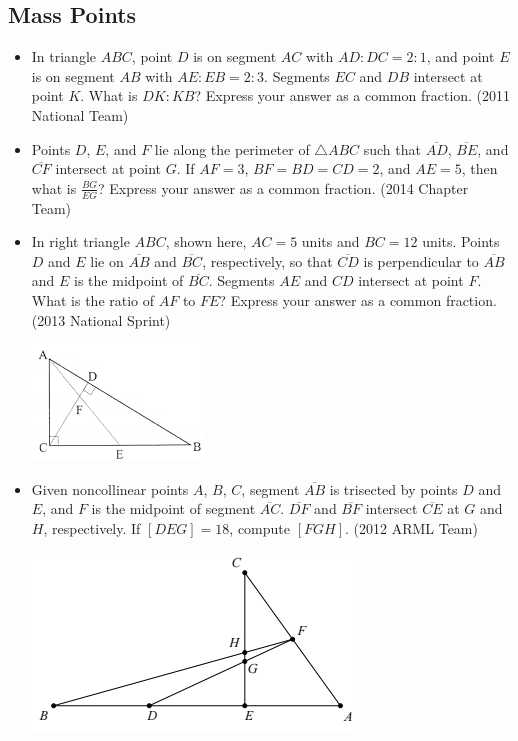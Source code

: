 \documentclass{article}
\begin{document}
\subsection{Mass Points}

\begin{itemize}

\item In triangle $ABC$, point $D$ is on segment $AC$ with $AD:DC=2:1$, and point $E$ is on segment $AB$ with $AE:EB=2:3$. Segments $EC$ and $DB$ intersect at point $K$. What is $DK:KB$? Express your answer as a common fraction. (2011 National Team)

\item Points $D$, $E$, and $F$ lie along the perimeter of $\triangle ABC$ such that $\overline{AD}$, $\overline{BE}$, and $\overline{CF}$ intersect at point $G$. If $AF=3$, $BF=BD=CD=2$, and $AE=5$, then what is $\frac{BG}{EG}$? Express your answer as a common fraction. (2014 Chapter Team)



\item In right triangle $ABC$, shown here, $AC=5$ units and $BC=12$ units. Points $D$ and $E$ lie on $\overline{AB}$ and $\overline{BC}$, respectively, so that $\overline{CD}$ is perpendicular to $\overline{AB}$ and $E$ is the midpoint of $\overline{BC}$. Segments $AE$ and $CD$ intersect at point $F$. What is the ratio of $AF$ to $FE$? Express your answer as a common fraction. (2013 National Sprint)

\centerline{\includegraphics{201328.png}}

\item Given noncollinear points $A$, $B$, $C$, segment $\overline{AB}$ is trisected by points $D$ and $E$, and $F$ is the midpoint of segment $\overline{AC}$. $\overline{DF}$ and $\overline{BF}$ intersect $\overline{CE}$ at $G$ and $H$, respectively. If $[DEG]=18$, compute $[FGH]$. (2012 ARML Team)

\centerline{\includegraphics{20127.png}}


\end{itemize}
\end{document}
